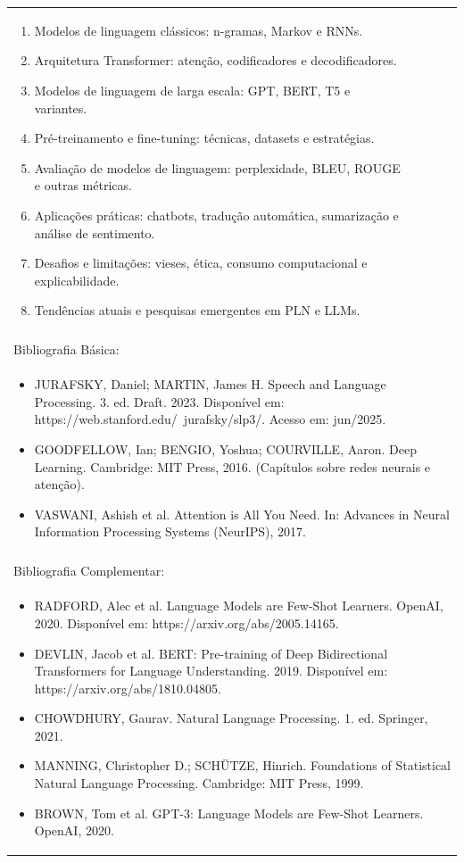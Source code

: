 \documentclass[11pt]{article}
\begin{document}
\begin{center}
\begin{longtable}{|p{4cm}|p{4cm}|p{4cm}|p{4cm}|}
{\begin{enumerate}
\item Modelos de linguagem clássicos: n-gramas, Markov e RNNs.
\item Arquitetura Transformer: atenção, codificadores e decodificadores.
\item Modelos de linguagem de larga escala: GPT, BERT, T5 e variantes.
\item Pré-treinamento e fine-tuning: técnicas, datasets e estratégias.
\item Avaliação de modelos de linguagem: perplexidade, BLEU, ROUGE e outras métricas.
\item Aplicações práticas: chatbots, tradução automática, sumarização e análise de sentimento.
\item Desafios e limitações: vieses, ética, consumo computacional e explicabilidade.
\item Tendências atuais e pesquisas emergentes em PLN e LLMs.\end{enumerate}}\\
\multicolumn{4}{|p{16cm}|}{}\\
\hline
\multicolumn{4}{|p{16cm}|}{Bibliografia Básica:}\\
\multicolumn{4}{|p{\dimexpr 16cm + 6\tabcolsep\relax}|}{%
\begin{itemize}\item JURAFSKY, Daniel; MARTIN, James H. Speech and Language Processing. 3. ed. Draft. 2023. Disponível em: https://web.stanford.edu/~jurafsky/slp3/. Acesso em: jun/2025.
\item GOODFELLOW, Ian; BENGIO, Yoshua; COURVILLE, Aaron. Deep Learning. Cambridge: MIT Press, 2016. (Capítulos sobre redes neurais e atenção).
\item VASWANI, Ashish et al. Attention is All You Need. In: Advances in Neural Information Processing Systems (NeurIPS), 2017.\end{itemize}}\\
\multicolumn{4}{|p{16cm}|}{}\\
\hline
\multicolumn{4}{|p{16cm}|}{Bibliografia Complementar:}\\
\multicolumn{4}{|p{\dimexpr 16cm + 6\tabcolsep\relax}|}{%
\begin{itemize}\item RADFORD, Alec et al. Language Models are Few-Shot Learners. OpenAI, 2020. Disponível em: https://arxiv.org/abs/2005.14165.
\item DEVLIN, Jacob et al. BERT: Pre-training of Deep Bidirectional Transformers for Language Understanding. 2019. Disponível em: https://arxiv.org/abs/1810.04805.
\item CHOWDHURY, Gaurav. Natural Language Processing. 1. ed. Springer, 2021.
\item MANNING, Christopher D.; SCHÜTZE, Hinrich. Foundations of Statistical Natural Language Processing. Cambridge: MIT Press, 1999.
\item BROWN, Tom et al. GPT-3: Language Models are Few-Shot Learners. OpenAI, 2020.\end{itemize}}\\
\hline
\end{longtable}
\end{center}
\end{document}

